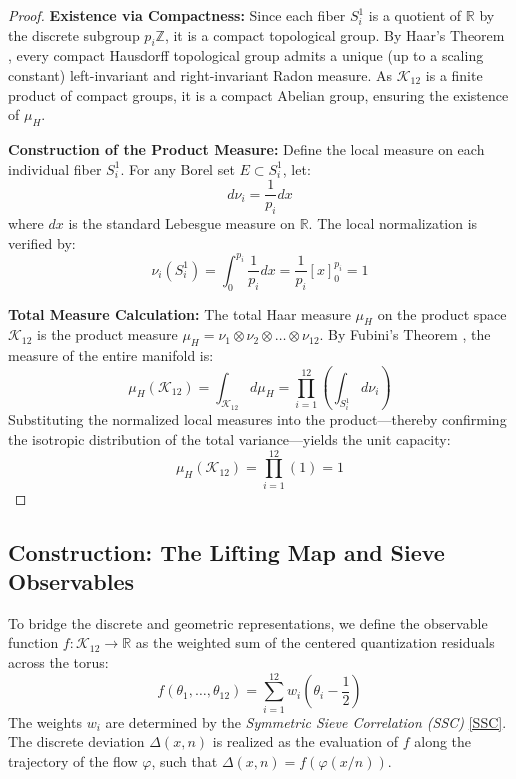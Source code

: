 \documentclass[sn-mathphys-num, pdflatex, referee]{sn-jnl}
\begin{document}
\begin{proof}
    \textbf{Existence via Compactness:} Since each fiber $S^1_i$ is a quotient of $\mathbb{R}$ by the discrete subgroup $p_i\mathbb{Z}$, it is a compact topological group. By Haar’s Theorem \cite{folland1995abstract}, every compact Hausdorff topological group admits a unique (up to a scaling constant) left-invariant and right-invariant Radon measure. As $\mathcal{K}_{12}$ is a finite product of compact groups, it is a compact Abelian group, ensuring the existence of $\mu_H$.

    \textbf{Construction of the Product Measure:} Define the local measure on each individual fiber $S^1_i$. For any Borel set $E \subset S^1_i$, let:
    \begin{equation}
    d\nu_i = \frac{1}{p_i} dx
    \end{equation}
    where $dx$ is the standard Lebesgue measure on $\mathbb{R}$. The local normalization is verified by:
    \begin{equation}
    \nu_i(S^1_i) = \int_0^{p_i} \frac{1}{p_i} dx = \frac{1}{p_i} [x]_0^{p_i} = 1
    \end{equation}

    \textbf{Total Measure Calculation:} The total Haar measure $\mu_H$ on the product space $\mathcal{K}_{12}$ is the product measure $\mu_H = \nu_1 \otimes \nu_2 \otimes \dots \otimes \nu_{12}$. By Fubini’s Theorem \cite{rudin1987real}, the measure of the entire manifold is:
    \begin{equation}
    \mu_H(\mathcal{K}_{12}) = \int_{\mathcal{K}_{12}} d\mu_H = \prod_{i=1}^{12} \left( \int_{S^1_i} d\nu_i \right)
    \end{equation}
    Substituting the normalized local measures into the product—thereby confirming the isotropic distribution of the total variance—yields the unit capacity: 
    \begin{equation}
    \mu_H(\mathcal{K}_{12}) = \prod_{i=1}^{12} (1) = 1
    \end{equation}
\end{proof}

\subsection{Construction: The Lifting Map and Sieve Observables}

To bridge the discrete and geometric representations, we define the observable function $f: \mathcal{K}_{12} \to \mathbb{R}$ as the weighted sum of the centered quantization residuals across the torus:
\begin{equation}
f(\theta_1, \dots, \theta_{12}) = \sum_{i=1}^{12} w_i \left( \theta_i - \frac{1}{2} \right)
\end{equation}
The weights $w_i$ are determined by the \textit{Symmetric Sieve Correlation (SSC)} \ref{SSC}. The discrete deviation $\Delta(x, n)$ is realized as the evaluation of $f$ along the trajectory of the flow $\varphi$, such that $\Delta(x, n) = f(\varphi(x/n))$. 
\end{document}
